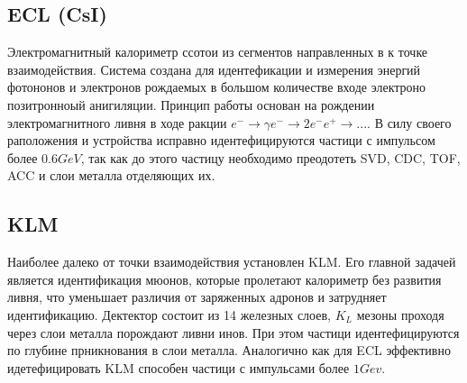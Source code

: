 \subsection{ECL (CsI)}

Электромагнитный калориметр ссотои из сегментов направленных в к точке взаимодействия. 
Система создана для идентефикации и измерения энергий фотононов и электронов 
рождаемых в большом количестве входе электроно позитронноый анигиляции. 
Принцип работы основан на рождении электромагнитного ливня в ходе ракции
$e^- \to \gamma e^- \to 2e^- e^+ \to ...$. В силу своего раположения и устройства 
исправно идентефицируются частици с импульсом более $0.6 GeV$, так как до этого частицу необходимо 
преодотеть SVD, CDC, TOF, ACC и слои металла отделяющих их.

\subsection{KLM}

Наиболее далеко от точки взаимодействия установлен KLM. Его главной задачей
является идентификация мюонов, которые пролетают калориметр без развития 
ливня, что уменьшает различия от заряженных адронов и затрудняет идентификацию.
Дектектор состоит из 14 железных слоев, $K_L$ мезоны проходя через слои металла
порождают ливни инов. При этом частици идентефицируются по глубине прникнования 
в слои металла. Аналогично как для ECL эффективно идетефицировать KLM способен 
частици с импульсами более $1 Gev$.




